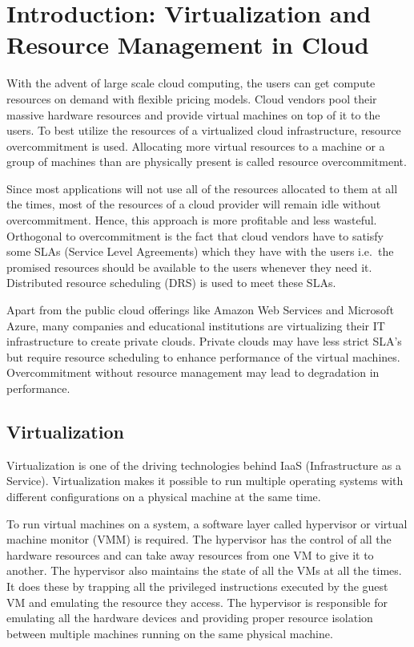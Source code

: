 \chapter{Introduction: Virtualization and Resource Management in Cloud}
\label{chap:intro}

With the advent of large scale cloud computing, the users can get compute resources on demand with flexible pricing models. Cloud vendors pool their massive hardware resources and provide virtual machines on top of it to the users. To best utilize the resources of a virtualized cloud infrastructure, resource overcommitment is used. Allocating more virtual resources to a machine or a group of machines than are physically present is called resource overcommitment.

Since most applications will not use all of the resources allocated to them at all the times, most of the resources of a cloud provider will remain idle without overcommitment. Hence, this approach is more profitable and less wasteful. Orthogonal to overcommitment is the fact that cloud vendors have to satisfy some SLAs (Service Level Agreements) which they have with the users i.e.\ the promised resources should be available to the users whenever they need it. Distributed resource scheduling (DRS) is used to meet these SLAs.

Apart from the public cloud offerings like Amazon Web Services and Microsoft Azure, many companies and educational institutions are virtualizing their IT infrastructure to create private clouds. Private clouds may have less strict SLA's but require resource scheduling to enhance performance of the virtual machines. Overcommitment without resource management may lead to degradation in performance.

\section{Virtualization}
Virtualization is one of the driving technologies behind IaaS (Infrastructure as a Service). Virtualization makes it possible to run multiple operating systems with different configurations on a physical machine at the same time. 

To run virtual machines on a system, a software layer called hypervisor or virtual machine monitor (VMM) is required. The hypervisor has the control of all the hardware resources and can take away resources from one VM to give it to another. The hypervisor also maintains the state of all the VMs at all the times. It does these by trapping all the privileged instructions executed by the guest VM and emulating the resource they access. The hypervisor is responsible for emulating all the hardware devices and providing proper resource isolation between multiple machines running on the same physical machine. 


